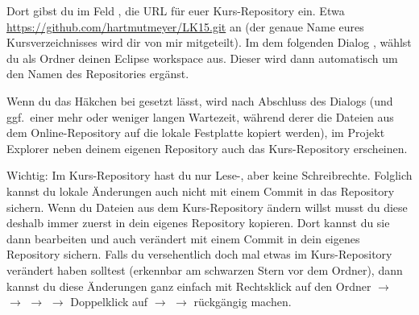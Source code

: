 Dort gibst du im Feld , die URL für euer Kurs-Repository ein. Etwa
\url{https://github.com/hartmutmeyer/LK15.git} an (der genaue Name eures
Kursverzeichnisses wird dir von mir mitgeteilt). Im dem folgenden Dialog
, wählst du als Ordner deinen
Eclipse workspace aus. Dieser wird dann automatisch um den Namen des
Repositories ergänst.

Wenn du das Häkchen bei  gesetzt lässt, wird nach Abschluss des Dialogs (und ggf.\ einer mehr
oder weniger langen Wartezeit, während derer die Dateien aus dem
Online-Repository auf die lokale Festplatte kopiert werden), im Projekt Explorer
neben deinem eigenen Repository auch das Kurs-Repository erscheinen.

Wichtig: Im Kurs-Repository hast du nur Lese-, aber keine Schreibrechte.
Folglich kannst du lokale Änderungen auch nicht mit einem Commit in das
Repository sichern. Wenn du Dateien aus dem Kurs-Repository ändern willst musst
du diese deshalb immer zuerst in dein eigenes Repository kopieren. Dort kannst
du sie dann bearbeiten und auch verändert mit einem Commit in dein eigenes
Repository sichern. Falls du versehentlich doch mal etwas im Kurs-Repository
verändert haben solltest (erkennbar am schwarzen Stern vor dem Ordner), dann
kannst du diese Änderungen ganz einfach mit Rechtsklick auf den
Ordner $\rightarrow$  $\rightarrow$ 
$\rightarrow$  $\rightarrow$
Doppelklick auf  $\rightarrow$ 
$\rightarrow$  rückgängig machen.


